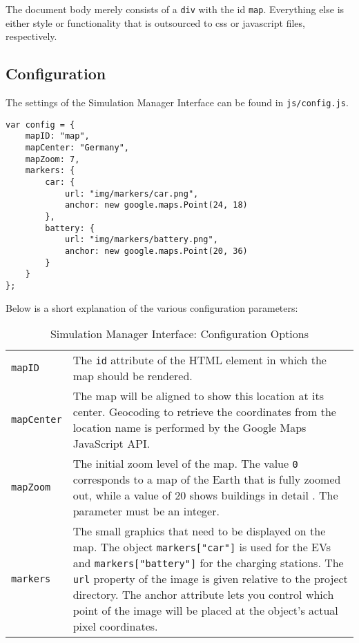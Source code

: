 The document body merely consists of a \texttt{div} with the id \texttt{map}. Everything else is either style or functionality that is outsourced to css or javascript files, respectively.

\newpage
\subsection{Configuration}

The settings of the Simulation Manager Interface can be found in \texttt{js/config.js}.

\begin{verbatim}
var config = {
    mapID: "map",
    mapCenter: "Germany",
    mapZoom: 7,
    markers: {
        car: {
            url: "img/markers/car.png",
            anchor: new google.maps.Point(24, 18)
        },
        battery: {
            url: "img/markers/battery.png",
            anchor: new google.maps.Point(20, 36)
        }
    }
};
\end{verbatim}

Below is a short explanation of the various configuration parameters:

\begin{table}[htp]
\renewcommand{\arraystretch}{1.9}
\begin{tabular}{p{1.8cm}p{5.6cm}}
\texttt{mapID} & The \texttt{id} attribute of the HTML element in which the map should be rendered.\\
\texttt{mapCenter} &  The map will be aligned to show this location at its center. Geocoding to retrieve the coordinates from the location name is performed by the Google Maps JavaScript API.\\
\texttt{mapZoom} &  The initial zoom level of the map. The value \texttt{0} corresponds to a map of the Earth that is fully zoomed out, while a value of 20 shows buildings in detail \cite{google-api-zoom}. The parameter must be an integer.\\
\texttt{markers} & The small graphics that need to be displayed on the map. The object \texttt{markers["car"]} is used for the EVs and \texttt{markers["battery"]} for the charging stations.
\newline\newline
The \texttt{url} property of the image is given relative to the project directory. The anchor attribute lets you control which point of the image will be placed at the object's actual pixel coordinates.
\end{tabular}
\vspace{4mm}
\caption{Simulation Manager Interface: Configuration Options}
\end{table}


